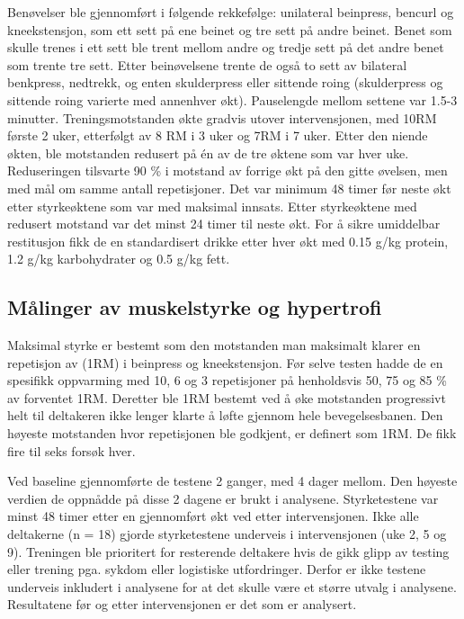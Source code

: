 \documentclass[
  letterpaper,
  DIV=11,
  numbers=noendperiod]{scrreprt}
\begin{document}
Benøvelser ble gjennomført i følgende rekkefølge: unilateral beinpress,
bencurl og kneekstensjon, som ett sett på ene beinet og tre sett på
andre beinet. Benet som skulle trenes i ett sett ble trent mellom andre
og tredje sett på det andre benet som trente tre sett. Etter
beinøvelsene trente de også to sett av bilateral benkpress, nedtrekk, og
enten skulderpress eller sittende roing (skulderpress og sittende roing
varierte med annenhver økt). Pauselengde mellom settene var 1.5-3
minutter. Treningsmotstanden økte gradvis utover intervensjonen, med
10RM første 2 uker, etterfølgt av 8 RM i 3 uker og 7RM i 7 uker. Etter
den niende økten, ble motstanden redusert på én av de tre øktene som var
hver uke. Reduseringen tilsvarte 90 \% i motstand av forrige økt på den
gitte øvelsen, men med mål om samme antall repetisjoner. Det var minimum
48 timer før neste økt etter styrkeøktene som var med maksimal innsats.
Etter styrkeøktene med redusert motstand var det minst 24 timer til
neste økt. For å sikre umiddelbar restitusjon fikk de en standardisert
drikke etter hver økt med 0.15 g/kg protein, 1.2 g/kg karbohydrater og
0.5 g/kg fett.

\subsection{Målinger av muskelstyrke og
hypertrofi}\label{muxe5linger-av-muskelstyrke-og-hypertrofi}

Maksimal styrke er bestemt som den motstanden man maksimalt klarer en
repetisjon av (1RM) i beinpress og kneekstensjon. Før selve testen hadde
de en spesifikk oppvarming med 10, 6 og 3 repetisjoner på henholdsvis
50, 75 og 85 \% av forventet 1RM. Deretter ble 1RM bestemt ved å øke
motstanden progressivt helt til deltakeren ikke lenger klarte å løfte
gjennom hele bevegelsesbanen. Den høyeste motstanden hvor repetisjonen
ble godkjent, er definert som 1RM. De fikk fire til seks forsøk hver.

Ved baseline gjennomførte de testene 2 ganger, med 4 dager mellom. Den
høyeste verdien de oppnådde på disse 2 dagene er brukt i analysene.
Styrketestene var minst 48 timer etter en gjennomført økt ved etter
intervensjonen. Ikke alle deltakerne (n = 18) gjorde styrketestene
underveis i intervensjonen (uke 2, 5 og 9). Treningen ble prioritert for
resterende deltakere hvis de gikk glipp av testing eller trening pga.
sykdom eller logistiske utfordringer. Derfor er ikke testene underveis
inkludert i analysene for at det skulle være et større utvalg i
analysene. Resultatene før og etter intervensjonen er det som er
analysert.
\end{document}
